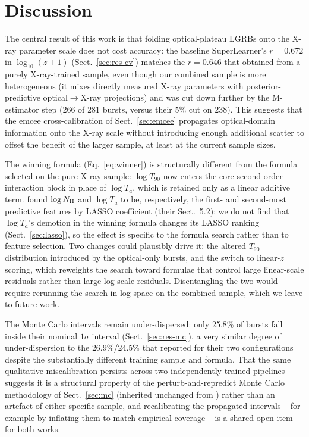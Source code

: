 \documentclass{aa}
\newcommand{\Ta}{T_a}
\newcommand{\NH}{N_{\rm H}}
\newcommand{\logz}{\log_{10}(z+1)}
\begin{document}
\section{Discussion}
\label{sec:discussion}

The central result of this work is that folding optical-plateau LGRBs onto the
X-ray parameter scale does not cost accuracy: the baseline SuperLearner's
$r=0.672$ in $\logz$ (Sect.~\ref{sec:res-cv}) matches the $r=0.646$ that
\citet{narendra2025} obtained from a purely X-ray-trained sample, even though
our combined sample is more heterogeneous (it mixes directly measured X-ray
parameters with posterior-predictive optical$\rightarrow$X-ray projections)
and was cut down further by the M-estimator step (266 of 281 bursts, versus
their 5\% cut on 238). This suggests that the emcee cross-calibration of
Sect.~\ref{sec:emcee} propagates optical-domain information onto the X-ray
scale without introducing enough additional scatter to offset the benefit of
the larger sample, at least at the current sample sizes.

The winning formula (Eq.~\ref{eq:winner}) is structurally different from the
formula selected on the pure X-ray sample: $\log T_{90}$ now enters the core
second-order interaction block in place of $\log \Ta$, which is retained only
as a linear additive term. \citet{narendra2025} found $\log \NH$ and
$\log \Ta$ to be, respectively, the first- and second-most predictive
features by LASSO coefficient (their Sect.~5.2); we do not find that
$\log \Ta$'s demotion in the winning formula changes its LASSO ranking
(Sect.~\ref{sec:lasso}), so the effect is specific to the formula search
rather than to feature selection. Two changes could plausibly drive it: the
altered $T_{90}$ distribution introduced by the optical-only bursts, and the
switch to linear-$z$ scoring, which reweights the search toward formulae that
control large linear-scale residuals rather than large log-scale residuals.
Disentangling the two would require rerunning the search in log space on the
combined sample, which we leave to future work.

The Monte Carlo intervals remain under-dispersed: only 25.8\% of bursts fall
inside their nominal $1\sigma$ interval (Sect.~\ref{sec:res-mc}), a very
similar degree of under-dispersion to the $26.9\%$/$24.5\%$ that
\citet{narendra2025} reported for their two configurations despite the
substantially different training sample and formula. That the same qualitative
miscalibration persists across two independently trained pipelines suggests it
is a structural property of the perturb-and-repredict Monte Carlo methodology
of Sect.~\ref{sec:mc} (inherited unchanged from \citealt{narendra2025}) rather
than an artefact of either specific sample, and recalibrating the propagated
intervals -- for example by inflating them to match empirical coverage -- is a
shared open item for both works.
\end{document}
